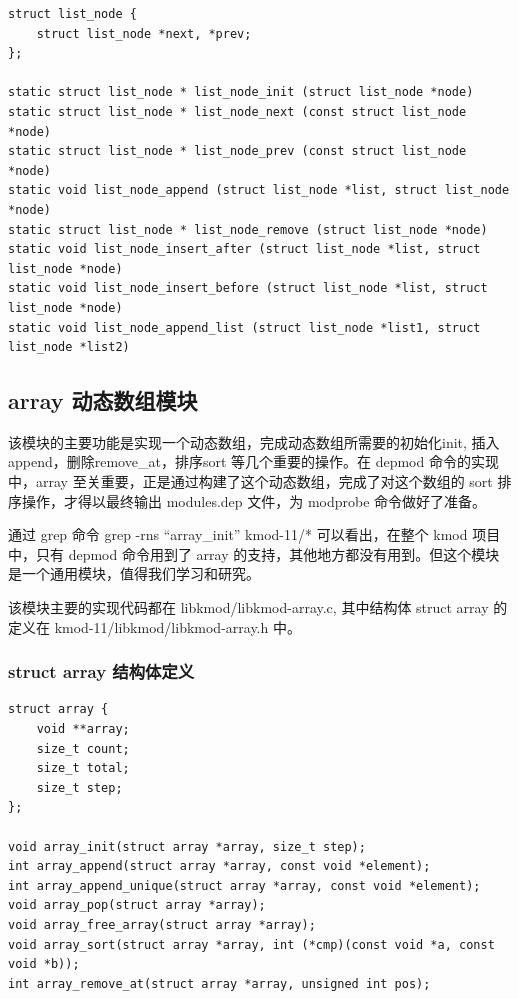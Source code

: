 {\begin{shaded}\begin{verbatim}
struct list_node {
    struct list_node *next, *prev;
};

static struct list_node * list_node_init (struct list_node *node)
static struct list_node * list_node_next (const struct list_node *node)
static struct list_node * list_node_prev (const struct list_node *node)
static void list_node_append (struct list_node *list, struct list_node *node)
static struct list_node * list_node_remove (struct list_node *node)
static void list_node_insert_after (struct list_node *list, struct list_node *node)
static void list_node_insert_before (struct list_node *list, struct list_node *node)
static void list_node_append_list (struct list_node *list1, struct list_node *list2)
\end{verbatim}\end{shaded}}
\subsection{array 动态数组模块}

该模块的主要功能是实现一个动态数组，完成动态数组所需要的初始化init,
插入append，删除remove\_at，排序sort 等几个重要的操作。在 depmod
命令的实现中，array
至关重要，正是通过构建了这个动态数组，完成了对这个数组的 sort
排序操作，才得以最终输出 modules.dep 文件，为 modprobe 命令做好了准备。

通过 grep 命令 grep -rns ``array\_init'' kmod-11/* 可以看出，在整个 kmod
项目中，只有 depmod 命令用到了 array
的支持，其他地方都没有用到。但这个模块是一个通用模块，值得我们学习和研究。

该模块主要的实现代码都在 libkmod/libkmod-array.c, 其中结构体 struct
array 的定义在 kmod-11/libkmod/libkmod-array.h 中。

\subsubsection{struct array 结构体定义}

{\begin{shaded}\begin{verbatim}
struct array {
    void **array;
    size_t count;
    size_t total;
    size_t step;
};

void array_init(struct array *array, size_t step);
int array_append(struct array *array, const void *element);
int array_append_unique(struct array *array, const void *element);
void array_pop(struct array *array);
void array_free_array(struct array *array);
void array_sort(struct array *array, int (*cmp)(const void *a, const void *b));
int array_remove_at(struct array *array, unsigned int pos); 
\end{verbatim}\end{shaded}}
